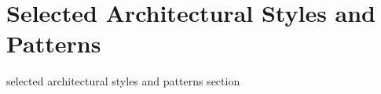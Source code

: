 \documentclass[../../../../dd.tex]{subfiles}
\begin{document}
	\section{Selected Architectural Styles and Patterns}

	selected architectural styles and patterns section
	
\end{document}
